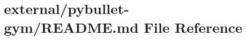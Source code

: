 \hypertarget{external_2pybullet-gym_2_r_e_a_d_m_e_8md}{}\section{external/pybullet-\/gym/\+R\+E\+A\+D\+ME.md File Reference}
\label{external_2pybullet-gym_2_r_e_a_d_m_e_8md}
